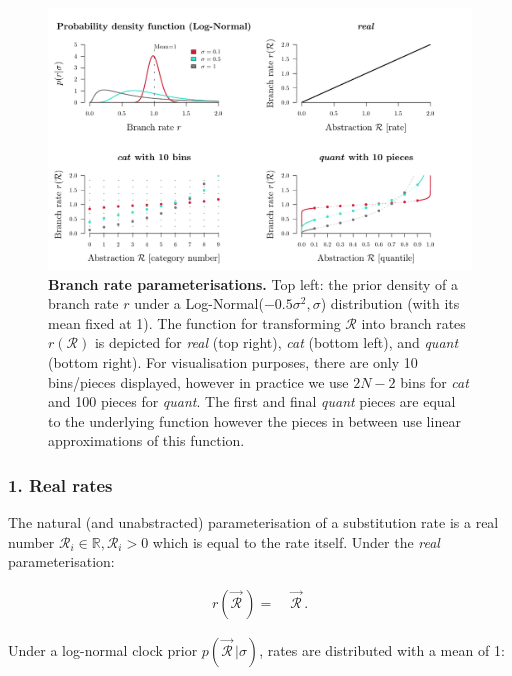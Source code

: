 \documentclass[10pt,letterpaper]{article}
\begin{document}
\begin{figure}[!h]
\includegraphics[width=\textwidth]{Figures/rateparameterisation.pdf}
\caption{\textbf{Branch rate parameterisations.} Top left: the prior density of a branch rate $r$ under a Log-Normal($-0.5\sigma^2, \sigma$) distribution (with its mean fixed at 1). 
The function for transforming $\mathcal{R}$ into branch rates $r(\mathcal{R})$ is depicted for \textit{real} (top right), \textit{cat} (bottom left), and \textit{quant} (bottom right).
For visualisation purposes, there are only 10 bins/pieces displayed, however in practice we use $2N-2$ bins for \textit{cat} and 100 pieces for \textit{quant}.
The first and final \textit{quant} pieces are equal to the underlying function however the pieces in between use linear approximations of this function. }
\label{fig:rateparams}
\end{figure}



\clearpage
\subsubsection*{1. Real rates}
The natural (and unabstracted) parameterisation of a substitution rate is a real number $\mathcal{R}_i \in \mathbb{R}, \mathcal{R}_i > 0$ which is equal to the rate itself. 
Under the \textit{real} parameterisation:

\begin{align}
r(\vec{\mathcal{R}}^{\,}) =& \; \vec{\mathcal{R}}^{\,}.
\end{align}


Under a log-normal clock prior $p(\vec{\mathcal{R}}^{\,} | \sigma)$, rates are distributed with a mean of 1:
\end{document}
